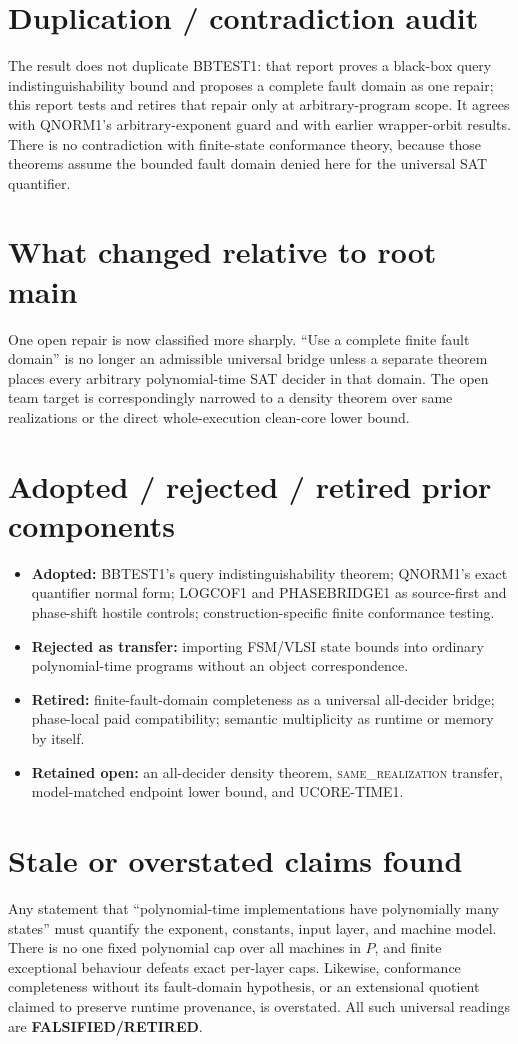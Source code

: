 \documentclass[11pt]{article}
\newcommand{\RET}{\textbf{FALSIFIED/RETIRED}}
\newcommand{\same}{\textnormal{\textsc{same\_realization}}}
\begin{document}
\section*{Duplication / contradiction audit}
The result does not duplicate BBTEST1: that report proves a black-box query
indistinguishability bound and proposes a complete fault domain as one repair;
this report tests and retires that repair only at arbitrary-program scope.
It agrees with QNORM1's arbitrary-exponent guard and with earlier wrapper-orbit
results.  There is no contradiction with finite-state conformance theory,
because those theorems assume the bounded fault domain denied here for the
universal SAT quantifier.

\section*{What changed relative to root main}
One open repair is now classified more sharply.  ``Use a complete finite fault
domain'' is no longer an admissible universal bridge unless a separate theorem
places every arbitrary polynomial-time SAT decider in that domain.  The open
team target is correspondingly narrowed to a density theorem over same
realizations or the direct whole-execution clean-core lower bound.

\section*{Adopted / rejected / retired prior components}
\begin{itemize}
\item \textbf{Adopted:} BBTEST1's query indistinguishability theorem;
QNORM1's exact quantifier normal form; LOGCOF1 and PHASEBRIDGE1 as source-first
and phase-shift hostile controls; construction-specific finite conformance
testing.
\item \textbf{Rejected as transfer:} importing FSM/VLSI state bounds into
ordinary polynomial-time programs without an object correspondence.
\item \textbf{Retired:} finite-fault-domain completeness as a universal
all-decider bridge; phase-local paid compatibility; semantic multiplicity as
runtime or memory by itself.
\item \textbf{Retained open:} an all-decider density theorem,
\same{} transfer, model-matched endpoint lower bound, and UCORE-TIME1.
\end{itemize}

\section*{Stale or overstated claims found}
Any statement that ``polynomial-time implementations have polynomially many
states'' must quantify the exponent, constants, input layer, and machine
model.  There is no one fixed polynomial cap over all machines in \(P\), and
finite exceptional behaviour defeats exact per-layer caps.  Likewise,
conformance completeness without its fault-domain hypothesis, or an
extensional quotient claimed to preserve runtime provenance, is overstated.
All such universal readings are \RET{}.
\end{document}
